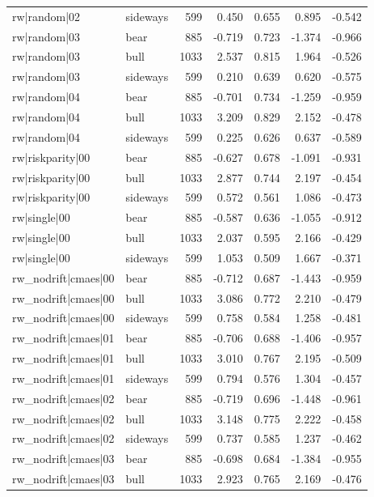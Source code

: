 \begin{table}
\begin{tabular}{llrrrrr}
rw|random|02 & sideways & 599 & 0.450 & 0.655 & 0.895 & -0.542 \\
rw|random|03 & bear & 885 & -0.719 & 0.723 & -1.374 & -0.966 \\
rw|random|03 & bull & 1033 & 2.537 & 0.815 & 1.964 & -0.526 \\
rw|random|03 & sideways & 599 & 0.210 & 0.639 & 0.620 & -0.575 \\
rw|random|04 & bear & 885 & -0.701 & 0.734 & -1.259 & -0.959 \\
rw|random|04 & bull & 1033 & 3.209 & 0.829 & 2.152 & -0.478 \\
rw|random|04 & sideways & 599 & 0.225 & 0.626 & 0.637 & -0.589 \\
rw|riskparity|00 & bear & 885 & -0.627 & 0.678 & -1.091 & -0.931 \\
rw|riskparity|00 & bull & 1033 & 2.877 & 0.744 & 2.197 & -0.454 \\
rw|riskparity|00 & sideways & 599 & 0.572 & 0.561 & 1.086 & -0.473 \\
rw|single|00 & bear & 885 & -0.587 & 0.636 & -1.055 & -0.912 \\
rw|single|00 & bull & 1033 & 2.037 & 0.595 & 2.166 & -0.429 \\
rw|single|00 & sideways & 599 & 1.053 & 0.509 & 1.667 & -0.371 \\
rw\_nodrift|cmaes|00 & bear & 885 & -0.712 & 0.687 & -1.443 & -0.959 \\
rw\_nodrift|cmaes|00 & bull & 1033 & 3.086 & 0.772 & 2.210 & -0.479 \\
rw\_nodrift|cmaes|00 & sideways & 599 & 0.758 & 0.584 & 1.258 & -0.481 \\
rw\_nodrift|cmaes|01 & bear & 885 & -0.706 & 0.688 & -1.406 & -0.957 \\
rw\_nodrift|cmaes|01 & bull & 1033 & 3.010 & 0.767 & 2.195 & -0.509 \\
rw\_nodrift|cmaes|01 & sideways & 599 & 0.794 & 0.576 & 1.304 & -0.457 \\
rw\_nodrift|cmaes|02 & bear & 885 & -0.719 & 0.696 & -1.448 & -0.961 \\
rw\_nodrift|cmaes|02 & bull & 1033 & 3.148 & 0.775 & 2.222 & -0.458 \\
rw\_nodrift|cmaes|02 & sideways & 599 & 0.737 & 0.585 & 1.237 & -0.462 \\
rw\_nodrift|cmaes|03 & bear & 885 & -0.698 & 0.684 & -1.384 & -0.955 \\
rw\_nodrift|cmaes|03 & bull & 1033 & 2.923 & 0.765 & 2.169 & -0.476 \\

\end{tabular}
\end{table}
